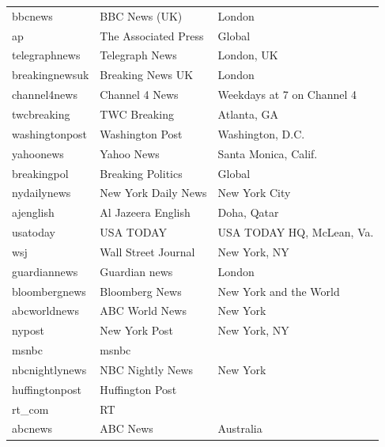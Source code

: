 \documentclass[10pt,letterpaper]{article}
\begin{document}
{\begin{longtable}{lll}
    bbcnews          &  BBC News (UK)         &  London                      \\
    ap               &  The Associated Press  &  Global                      \\
    telegraphnews    &  Telegraph News        &  London, UK                  \\
    breakingnewsuk   &  Breaking News UK      &  London                      \\
    channel4news     &  Channel 4 News        &  Weekdays at 7 on Channel 4  \\
    twcbreaking      &  TWC Breaking          &  Atlanta, GA                 \\
    washingtonpost   &  Washington Post       &  Washington, D.C.            \\
    yahoonews        &  Yahoo News            &  Santa Monica, Calif.        \\
    breakingpol      &  Breaking Politics     &  Global                      \\
    nydailynews      &  New York Daily News   &  New York City               \\
    ajenglish        &  Al Jazeera English    &  Doha, Qatar                 \\
    usatoday         &  USA TODAY             &  USA TODAY HQ, McLean, Va.   \\
    wsj              &  Wall Street Journal   &  New York, NY                \\
    guardiannews     &  Guardian news         &  London                      \\
    bloombergnews    &  Bloomberg News        &  New York and the World      \\
    abcworldnews     &  ABC World News        &  New York                    \\
    nypost           &  New York Post         &  New York, NY                \\
    msnbc            &  msnbc                 &                              \\
    nbcnightlynews   &  NBC Nightly News      &  New York                    \\
    huffingtonpost   &  Huffington Post       &                              \\
    rt\_com           &  RT                    &                              \\
    abcnews          &  ABC News              &  Australia                   \\

\end{longtable}}
\end{document}
